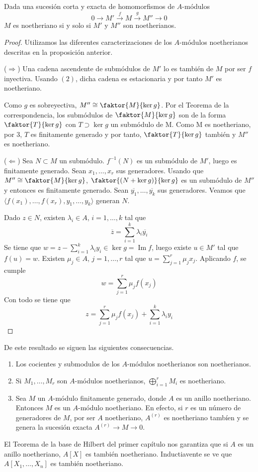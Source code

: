 \documentclass[../main.tex]{subfiles}
\begin{document}
\begin{proposition}
Dada una sucesión corta y exacta de homomorfismos de $A$-módulos $$0\longrightarrow M'\overset{f}{\longrightarrow}M\overset{g}{\longrightarrow}M''\longrightarrow 0$$ $M$ es noetheriano si y solo si $M'$ y $M''$ son noetherianos.
\end{proposition}
\begin{proof} Utilizamos las diferentes caracterizaciones de los $A$-módulos noetherianos descritas en la proposición anterior.

($\Longrightarrow$) Una cadena ascendente de submódulos de $M'$ lo es también de $M$ por ser $f$ inyectiva. Usando $(2)$, dicha cadena es estacionaria y por tanto $M'$ es noetheriano.

Como $g$ es sobreyectiva, $M''\cong\faktor{M}{\operatorname{ker} g}$. Por el Teorema de la correspondencia, los submódulos de $\faktor{M}{\operatorname{ker} g}$ son de la forma $\faktor{T}{\operatorname{ker} g}$ con $T\supset \operatorname{ker} g$ un submódulo de M. Como M es noetheriano, por $3$, $T$ es finitamente generado y por tanto, $\faktor{T}{\operatorname{ker} g}$ también y $M''$ es noetheriano.

($\Longleftarrow$) Sea $N\subset M$ un submódulo. $f^{-1}(N)$ es un submódulo de $M'$, luego es finitamente generado. Sean $x_1,\dots,x_r$ sus generadores. Usando que $M''\cong\faktor{M}{\operatorname{ker} g}$, $\faktor{(N+\operatorname{ker} g)}{\operatorname{ker} g}$ es un submódulo de $M''$ y entonces es finitamente generado. Sean $\overline{y_1},\dots,\overline{y_k}$ sus generadores. Veamos que $\langle f(x_1),\dots,f(x_r),y_1,\dots,y_k\rangle$ generan $N$.

Dado $z\in N$, existen $\lambda_i\in A$, $i=1,\dots,k$ tal que $$\overline{z}=\sum_{i=1}^k\lambda_i\overline{y_i}$$ Se tiene que $w=z-\sum_{i=1}^k\lambda_iy_i\in\operatorname{ker} g=\operatorname{Im} f$, luego existe $u\in M'$ tal que $f(u)=w$. Existen $\mu_j\in A$, $j=1,\dots,r$ tal que $u=\sum_{j=1}^r\mu_jx_j$. Aplicando $f$, se cumple $$w=\sum_{j=1}^r\mu_jf(x_j)$$ Con todo se tiene que $$z=\sum_{j=1}^r\mu_jf(x_j)+\sum_{i=1}^k\lambda_iy_i$$
\end{proof}
\begin{remark}
De este resultado se siguen las siguientes consecuencias.\begin{enumerate}
    \item Los cocientes y submodulos de los $A$-módulos noetherianos son noetherianos.
    \item Si $M_1,\dots,M_r$ son $A$-módulos noetherianos, $\bigoplus_{i=1}^rM_i$ es noetheriano.
    \item Sea $M$ un $A$-módulo finitamente generado, donde $A$ es un anillo noetheriano. Entonces $M$ es un $A$-módulo noetheriano. En efecto, si $r$ es un número de generadores de $M$, por ser $A$ noetheriano, $A^{(r)}$ es noetheriano tambíen y se genera la sucesión exacta $A^{(r)}\rightarrow M\rightarrow 0$.
\end{enumerate}
\end{remark}
El Teorema de la base de Hilbert del primer capítulo nos garantiza que si $A$ es un anillo noetheriano, $A[X]$ es también noetheriano. Inductiavente se ve que $A[X_1,\dots,X_n]$ es también noetheriano.
\end{document}
